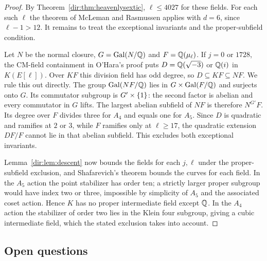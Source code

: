\begin{proof}
By Theorem~\ref{dir:thm:heavenlysextic}, $\ell\le4027$ for these fields. For each such $\ell$
the theorem of McLeman and Rasmussen applies with $d=6$, since $\ell-1>12$. It remains
to treat the exceptional invariants and the proper-subfield condition.

Let $N$ be the normal closure, $G=\operatorname{Gal}(N/\mathbb{Q})$ and $F=\mathbb{Q}(\mu_\ell)$. If $j=0$ or
$1728$, the CM-field containment in O'Hara's proof puts $D=\mathbb{Q}(\sqrt{-3})$ or $\mathbb{Q}(i)$
in $K(E[\ell])$. Over $KF$ this division field has odd degree, so
$D\subseteq KF\subseteq NF$. We rule this out directly. The group
$\operatorname{Gal}(NF/\mathbb{Q})$ lies in $G\times\operatorname{Gal}(F/\mathbb{Q})$ and surjects onto $G$. Its commutator
subgroup is $G'\times\{1\}$: the second factor is abelian and every commutator in
$G$ lifts. The largest abelian subfield of $NF$ is therefore $N^{G'}F$. Its degree
over $F$ divides three for $A_4$ and equals one for $A_5$. Since $D$ is quadratic and
ramifies at $2$ or $3$, while $F$ ramifies only at $\ell\ge17$, the quadratic extension
$DF/F$ cannot lie in that abelian subfield. This excludes both exceptional invariants.

Lemma~\ref{dir:lem:descent} now bounds the fields for each $j,\ell$ under the
proper-subfield exclusion, and Shafarevich's theorem bounds the curves for each field.
In the $A_5$ action the point stabilizer has order ten; a strictly larger proper
subgroup would have index two or three, impossible by simplicity of $A_5$ and the
associated coset action. Hence $K$ has no proper intermediate field except $\mathbb{Q}$. In
the $A_4$ action the stabilizer of order two lies in the Klein four subgroup, giving a
cubic intermediate field, which the stated exclusion takes into account.
\end{proof}

\subsection{Open questions}\label{cmf:sec:open}
{\raggedright{}}


